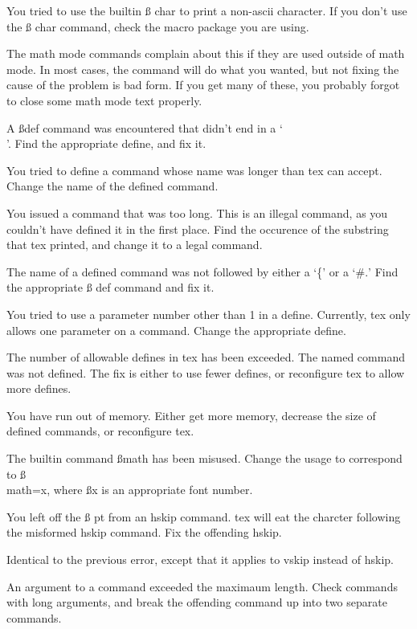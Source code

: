 { You tried to use the builtin {\ss
char} to print a non-ascii character. If you don't use the {\ss
char} command, check the macro package you are using.

 The math mode
commands complain about this if they are used outside of math
mode. In most cases, the command will do what you wanted, but not
fixing the cause of the problem is bad form. If you get many of
these, you probably forgot to close some math mode text properly.

 A {\ss def} command was encountered
that didn't end in a `\\'. Find the appropriate define, and fix it.

 You tried to define a command whose name
was longer than tex can accept. Change the name of the defined
command.

 You issued a command that was too long.
This is an illegal command, as you couldn't have defined it in
the first place. Find the occurence of the substring that tex
printed, and change it to a legal command.

 The name of a defined command was not
followed by either a `\{' or a `$\#.$' Find the appropriate {\ss
def} command and fix it.

 You tried to use a parameter number
other than 1 in a define. Currently, tex only allows one
parameter on a command. Change the appropriate define.

 The number of allowable defines in tex
has been exceeded. The named command was not defined. The fix is
either to use fewer defines, or reconfigure tex to allow more
defines.

 You have run out of memory. Either
get more memory, decrease the size of defined commands, or
reconfigure tex.

 The builtin command {\ss math} has
been misused. Change the usage to correspond to {\ss \\math=x,}
where {\ss x} is an appropriate font number.

 You left off the {\ss
pt} from an hskip command. tex will eat the charcter following
the misformed hskip command. Fix the offending hskip.

 Identical to the
previous error, except that it applies to vskip instead of hskip.

 An argument to a command exceeded the
maximaum length. Check commands with long arguments, and break
the offending command up into two separate commands.

}		%

